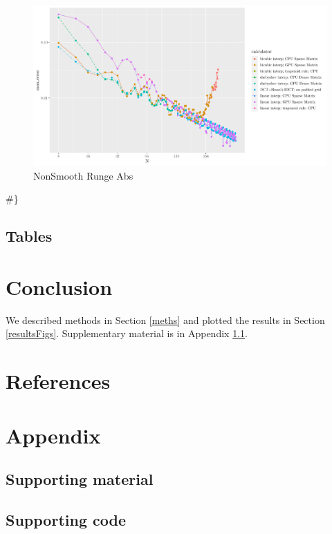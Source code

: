 \documentclass[
  letterpaper,
  landscape]{article}
\begin{document}
\begin{figure}

{\centering \includegraphics{myThesis_files/figure-latex/unnamed-chunk-8-1} 

}

\caption{NonSmooth Runge Abs}\label{fig:unnamed-chunk-8}
\end{figure}

\#\}

\hypertarget{resultsTables}{%
\subsection{Tables}\label{resultsTables}}

\hypertarget{con}{%
\section{Conclusion}\label{con}}

We described methods in Section \ref{meths} and plotted the results in
Section \ref{resultsFigs}. Supplementary material is in Appendix
\ref{app:mat}.

\hypertarget{references}{%
\section*{References}\label{references}}

\hypertarget{refs}{}

\renewcommand{\thesection}{\Alph{section}}
\setcounter{section}{1}

\hypertarget{appendix}{%
\section*{Appendix}\label{appendix}}

\hypertarget{app:mat}{%
\subsection{Supporting material}\label{app:mat}}

\hypertarget{supporting-code}{%
\subsection{Supporting code}\label{supporting-code}}
\end{document}
